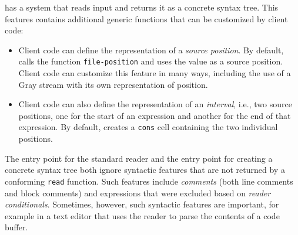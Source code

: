 \eclector{} has a system that reads input and returns it as a concrete
syntax tree.  This features contains additional generic functions that
can be customized by client code:

\begin{itemize}
\item Client code can define the representation of a \emph{source
  position}.  By default, \eclector{} calls the function
  \texttt{file-position} and uses the value as a source position.
  Client code can customize this feature in many ways, including the
  use of a Gray stream with its own representation of position.
\item Client code can also define the representation of an
  \emph{interval}, i.e., two source positions, one for the start of an
  expression and another for the end of that expression.  By default,
  \eclector{} creates a \texttt{cons} cell containing the two
  individual positions.
\end{itemize}

The entry point for the standard reader and the entry point for
creating a concrete syntax tree both ignore syntactic features that
are not returned by a conforming \texttt{read} function.  Such
features include \emph{comments} (both line comments and block
comments) and expressions that were excluded based on \emph{reader
  conditionals}.  Sometimes, however, such syntactic features are
important, for example in a text editor that uses the reader to parse
the contents of a \commonlisp{} code buffer.

